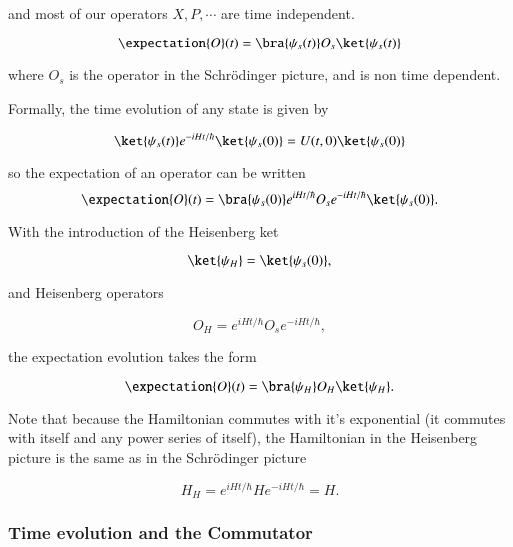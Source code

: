 and most of our operators $X, P, \cdots$ are time independent.

\begin{equation}\label{eqn:qmTwoL5:240}
\expectation{O}(t) = 
\bra{\psi_s(t)} O_s
\ket{\psi_s(t)}
\end{equation}

where $O_s$ is the operator in the Schr\"{o}dinger picture, and is non time dependent.

Formally, the time evolution of any state is given by

\begin{equation}\label{eqn:qmTwoL5:260}
\ket{\psi_s(t)}
e^{-i H t/\hbar}
\ket{\psi_s(0)} = U(t, 0) \ket{\psi_s(0)} 
\end{equation}

so the expectation of an operator can be written
\begin{equation}\label{eqn:qmTwoL5:280}
\expectation{O}(t) = 
\bra{\psi_s(0)} 
e^{i H t/\hbar}
O_s
e^{-i H t/\hbar}
\ket{\psi_s(0)}.
\end{equation}

With the introduction of the Heisenberg ket

\begin{equation}\label{eqn:qmTwoL5:300}
\ket{\psi_H} = \ket{\psi_s(0)},
\end{equation}

and Heisenberg operators

\begin{equation}\label{eqn:qmTwoL5:320}
O_H = e^{i H t/\hbar} O_s e^{-i H t/\hbar},
\end{equation}

the expectation evolution takes the form

\begin{equation}\label{eqn:qmTwoL5:340}
\expectation{O}(t) = 
\bra{\psi_H} 
O_H
\ket{\psi_H}.
\end{equation}

Note that because the Hamiltonian commutes with it's exponential (it commutes with itself and any power series of itself), the Hamiltonian in the Heisenberg picture is the same as in the Schr\"{o}dinger picture

\begin{equation}\label{eqn:qmTwoL5:360}
H_H = e^{i H t/\hbar} H e^{-i H t/\hbar} = H.
\end{equation}

\subsubsection{Time evolution and the Commutator}

